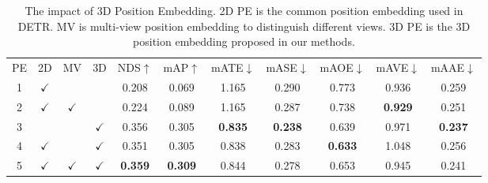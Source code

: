 \documentclass[runningheads]{llncs}
\begin{document}
\begin{table}[t]
    \begin{center}
    \caption{The impact of 3D Position Embedding. 2D PE is the common position embedding used in DETR. MV is multi-view  position embedding to distinguish different views. 3D PE is the 3D position embedding proposed in our methods.}
    \label{table:3}
    \begin{tabular}{c|ccc|ccccccc}
        \hline\noalign{\smallskip}
        PE & 2D & MV & 3D& NDS$\uparrow$ & mAP$\uparrow$  & mATE$\downarrow$ & mASE$\downarrow$ & mAOE$\downarrow$ & mAVE$\downarrow$ & mAAE$\downarrow$\\
        \noalign{\smallskip}
        \hline
        \noalign{\smallskip}
        1&$\checkmark$& & &0.208 &0.069 &1.165 &0.290 &0.773 &0.936 &0.259\\
        2&$\checkmark$ &$\checkmark$& &0.224 &0.089 &1.165 &0.287 &0.738 &\textbf{0.929} &0.251 \\
        3& & &$\checkmark$&0.356 &0.305 &\textbf{0.835} &\textbf{0.238} &0.639 &0.971 &\textbf{0.237} \\
        4&$\checkmark$& &$\checkmark$&0.351 &0.305 &0.838 &0.283 &\textbf{0.633} &1.048 &0.256 \\
        5&$\checkmark$&$\checkmark$&$\checkmark$&\textbf{0.359} &\textbf{0.309} &0.844 &0.278 &0.653 &0.945 &0.241 \\
        \hline
        \end{tabular}
    \label{tab:array}
\end{center}
\end{table}
\end{document}
